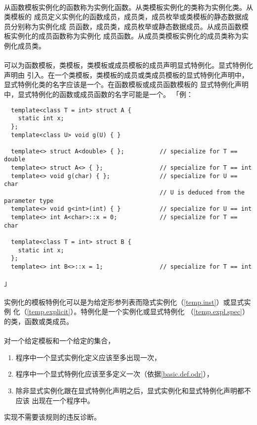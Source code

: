 \paragraph{}
从函数模板实例化的函数称为实例化函数。从类模板实例化的类称为实例化类。从类模板的
成员定义实例化的函数成员，成员类，成员枚举或类模板的静态数据成员分别称为实例化成
员函数，成员类，成员枚举或静态数据成员。从成员函数模板实例化的成员函数称为实例化
成员函数。从成员类模板实例化的成员类称为实例化成员类。

\paragraph{}
可以为函数模板，类模板，类模板或成员模板的成员声明显式特例化。显式特例化声明由
引入。在一个类模板，类模板的成员或类成员模板的显式特例化声明中，
显式特例化类的名字应该是一个。在函数模板或成员函数模板的
显式特例化声明中，显式特例化的函数或成员函数的名字可能是一个。
「例：
\begin{lstlisting}
  template<class T = int> struct A {
    static int x;
  };
  template<class U> void g(U) { }

  template<> struct A<double> { };          // specialize for T == double
  template<> struct A<> { };                // specialize for T == int
  template<> void g(char) { };              // specialize for U == char
                                            // U is deduced from the parameter type
  template<> void g<int>(int) { }           // specialize for U == int
  template<> int A<char>::x = 0;            // specialize for T == char

  template<class T = int> struct B {
    static int x;
  };
  template<> int B<>::x = 1;                // specialize for T == int
\end{lstlisting}」

\paragraph{}
实例化的模板特例化可以是为给定形参列表而隐式实例化（\ref{temp.inst}）或显式实例
化（\ref{temp.explicit}）。特例化是一个实例化或显式特例化
（\ref{temp.expl.spec}）的类，函数或类成员。

\paragraph{}
对一个给定模板和一个给定的集合，
\begin{enumerate}
  \item{程序中一个显式实例化定义应该至多出现一次，}
  \item{程序中一个显式特例化应该至多定义一次（依据\ref{basic.def.odr}），}
  \item{除非显式实例化跟在显式特例化声明之后，显式实例化和显式特例化声明都不应该
    出现在一个程序中。}
\end{enumerate}
实现不需要该规则的违反诊断。


